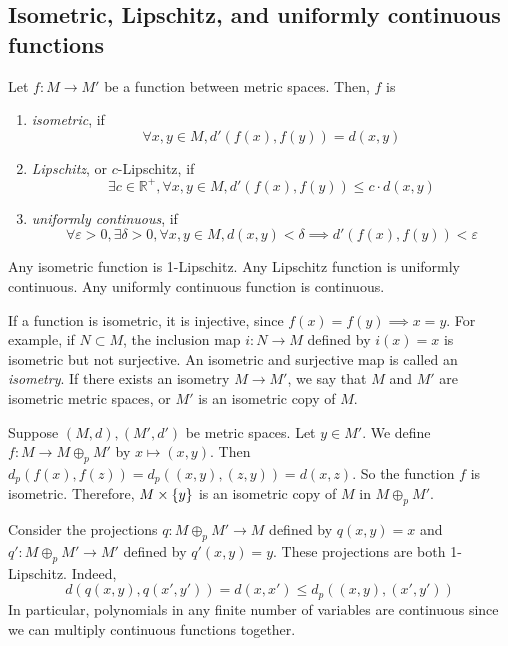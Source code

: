 \subsection{Isometric, Lipschitz, and uniformly continuous functions}
\begin{definition}
	Let \( f \colon M \to M' \) be a function between metric spaces.
	Then, \( f \) is
	\begin{enumerate}
		\item \textit{isometric}, if \[ \forall x,y \in M, d'(f(x),f(y)) = d(x,y) \]
		\item \textit{Lipschitz}, or \( c \)-Lipschitz, if \[ \exists c \in \mathbb R^+, \forall x,y \in M, d'(f(x),f(y)) \leq c\cdot d(x,y) \]
		\item \textit{uniformly continuous}, if \[ \forall \varepsilon > 0, \exists \delta > 0, \forall x,y \in M, d(x,y) < \delta \implies d'(f(x), f(y)) < \varepsilon \]
	\end{enumerate}
\end{definition}
\begin{remark}
	Any isometric function is 1-Lipschitz.
	Any Lipschitz function is uniformly continuous.
	Any uniformly continuous function is continuous.
\end{remark}
\begin{remark}
	If a function is isometric, it is injective, since \( f(x) = f(y) \implies x = y \).
	For example, if \( N \subset M \), the inclusion map \( i \colon N \to M \) defined by \( i(x) = x \) is isometric but not surjective.
	An isometric and surjective map is called an \textit{isometry}.
	If there exists an isometry \( M \to M' \), we say that \( M \) and \( M' \) are isometric metric spaces, or \( M' \) is an isometric copy of \( M \).
\end{remark}
\begin{example}
	Suppose \( (M, d), (M', d') \) be metric spaces.
	Let \( y \in M' \).
	We define \( f \colon M \to M \oplus_p M' \) by \( x \mapsto (x,y) \).
	Then \( d_p(f(x),f(z)) = d_p((x,y), (z,y)) = d(x,z) \).
	So the function \( f \) is isometric.
	Therefore, \( M \times \qty{ y } \) is an isometric copy of \( M \) in \( M \oplus_p M' \).
\end{example}
\begin{example}
	Consider the projections \( q \colon M \oplus_p M' \to M \) defined by \( q(x,y) = x \) and \( q' \colon M \oplus_p M' \to M' \) defined by \( q'(x,y) = y \).
	These projections are both 1-Lipschitz.
	Indeed,
	\[
		d(q(x,y), q(x',y')) = d(x,x') \leq d_p((x,y), (x',y'))
	\]
	In particular, polynomials in any finite number of variables are continuous since we can multiply continuous functions together.
\end{example}

